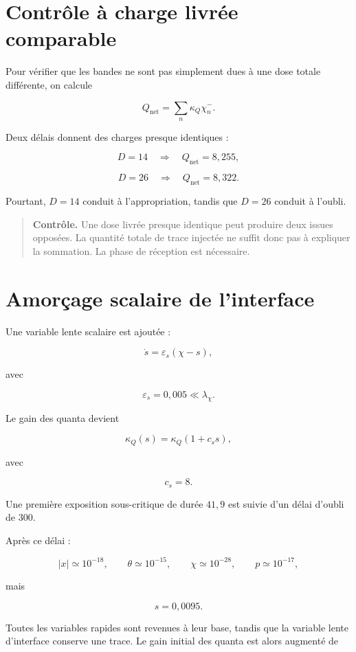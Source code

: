 \section{Contrôle à charge livrée comparable}
\label{annexe-num-controle-charge}

Pour vérifier que les bandes ne sont pas simplement dues à une dose
totale différente, on calcule

\[
Q_{\mathrm{net}}
=
\sum_n
\kappa_Q\chi_n^-.
\]

Deux délais donnent des charges presque identiques :

\[
D=14
\quad\Longrightarrow\quad
Q_{\mathrm{net}}=8{,}255,
\]

\[
D=26
\quad\Longrightarrow\quad
Q_{\mathrm{net}}=8{,}322.
\]

Pourtant, \(D=14\) conduit à l'appropriation, tandis que \(D=26\)
conduit à l'oubli.

\begin{quote}
\textbf{Contrôle.}
Une dose livrée presque identique peut produire deux issues opposées.
La quantité totale de trace injectée ne suffit donc pas à expliquer la
sommation. La phase de réception est nécessaire.
\end{quote}

\section{Amorçage scalaire de l'interface}
\label{annexe-num-amorcage-scalaire}

Une variable lente scalaire est ajoutée :

\[
\dot s=\varepsilon_s(\chi-s),
\]

avec

\[
\varepsilon_s=0{,}005\ll\lambda_\chi.
\]

Le gain des quanta devient

\[
\boxed{
\kappa_Q(s)=\kappa_Q(1+c_ss),
}
\]

avec

\[
c_s=8.
\]

Une première exposition sous-critique de durée \(41{,}9\) est suivie
d'un délai d'oubli de \(300\).

Après ce délai :

\[
|x|\simeq10^{-18},
\qquad
\theta\simeq10^{-15},
\qquad
\chi\simeq10^{-28},
\qquad
p\simeq10^{-17},
\]

mais

\[
\boxed{s=0{,}0095.}
\]

Toutes les variables rapides sont revenues à leur base, tandis que la
variable lente d'interface conserve une trace. Le gain initial des
quanta est alors augmenté de

